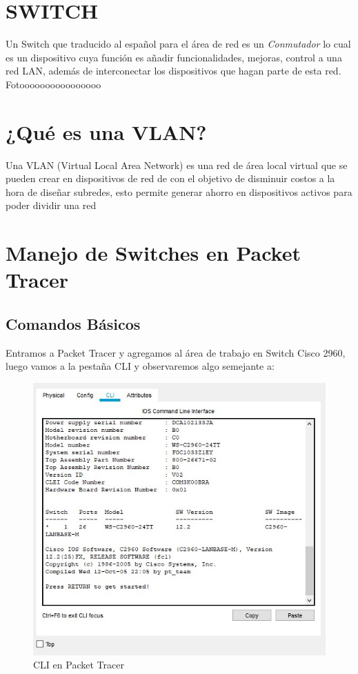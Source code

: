\documentclass[journal]{IEEEtran}
\begin{document}
\section{\textbf{SWITCH}}
Un Switch que traducido al español para el área de red es un \textit{Conmutador} lo cual es un dispositivo cuya función es añadir funcionalidades, mejoras, control a una red LAN, además de interconectar los dispositivos que hagan parte de esta red.
Fotoooooooooooooooo

\section{\textbf{¿Qué es una VLAN?}}
Una VLAN (Virtual Local Area Network) es una red de área local virtual que se pueden crear en dispositivos de red de con el objetivo de disminuir costos a la hora de diseñar subredes, esto permite generar ahorro en dispositivos activos para poder dividir una red

\section{\textbf{Manejo de Switches en Packet Tracer}}

\subsection{\textbf{Comandos Básicos}}
Entramos a Packet Tracer y agregamos al área de trabajo en Switch Cisco 2960, luego vamos a la pestaña CLI y observaremos algo semejante a:

\begin{figure}[ht]
	\centering
	\includegraphics[scale=0.5]{cli.jpg}
	\caption{CLI en Packet Tracer}
\end{figure}
\end{document}
